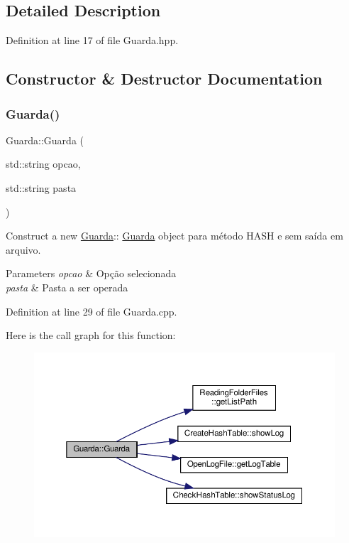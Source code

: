 \subsection{Detailed Description}


Definition at line 17 of file Guarda.\+hpp.



\subsection{Constructor \& Destructor Documentation}
\mbox{\label{class_guarda_a5d30e218759232802910bb3cabaddd2e}} 
\subsubsection{\texorpdfstring{Guarda()}{Guarda()}\hspace{0.1cm}{\footnotesize\ttfamily [1/4]}}
{\footnotesize\ttfamily Guarda\+::\+Guarda (\begin{DoxyParamCaption}\item[{std\+::string}]{opcao,  }\item[{std\+::string}]{pasta }\end{DoxyParamCaption})}



Construct a new \hyperlink{class_guarda}{Guarda}\+:\+: \hyperlink{class_guarda}{Guarda} object para método H\+A\+SH e sem saída em arquivo. 


\begin{DoxyParams}{Parameters}
{\em opcao} & Opção selecionada \\
\hline
{\em pasta} & Pasta a ser operada \\
\hline
\end{DoxyParams}


Definition at line 29 of file Guarda.\+cpp.

Here is the call graph for this function\+:
\nopagebreak
\begin{figure}[H]
\begin{center}
\leavevmode
\includegraphics[width=350pt]{d9/d5b/class_guarda_a5d30e218759232802910bb3cabaddd2e_cgraph}
\end{center}
\end{figure}
\mbox{\label{class_guarda_a296a1dd9b44b5a69e693692d5edccfe5}} 
